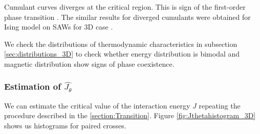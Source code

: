 Cumulant curves  diverges at the critical region. This is sign of the first-order phase transition \cite{PhysRevB.30.1477}. The similar results for diverged cumulants were obtained for Ising model on SAWs for 3D case \cite{PhysRevE.104.024122}.

 We check the distributions of thermodynamic characteristics in subsection \ref{sec:distributions_3D} to check whether energy distribution is bimodal and magnetic distribution show signs of phase coexistence. 


\subsubsection{ Estimation of $\hat{J_{\theta}}$}
 We can estimate the critical value of the interaction energy $J$ repeating the procedure described in the \ref{section:Transition}. Figure \ref{fig:Jthetahistogram_3D} shows us histograms for paired crosses. 


